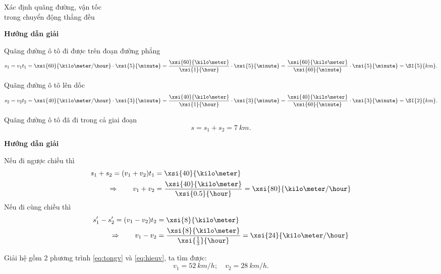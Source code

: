 \begin{dang}{Xác định quãng đường, vận tốc \\trong chuyển động thẳng đều}
	{	\begin{center}
			\textbf{Hướng dẫn giải}
		\end{center}
		
	Quãng đường ô tô đi được trên đoạn đường phẳng
	$$s_1 =v_1t_1 =\xsi{60}{\kilo\meter/\hour}\cdot\xsi{5}{\minute}=\dfrac{\xsi{60}{\kilo\meter}}{\xsi{1}{\hour}}\cdot\xsi{5}{\minute}=\dfrac{\xsi{60}{\kilo\meter}}{\xsi{60}{\minute}}\cdot\xsi{5}{\minute}=\SI{5}{km}.$$
	
	Quãng đường ô tô lên dốc
	$$s_2 = v_2t_2=\xsi{40}{\kilo\meter/\hour}\cdot\xsi{3}{\minute}=\dfrac{\xsi{40}{\kilo\meter}}{\xsi{1}{\hour}}\cdot\xsi{3}{\minute}=\dfrac{\xsi{40}{\kilo\meter}}{\xsi{60}{\minute}}\cdot\xsi{3}{\minute} = \SI{2}{km}.$$
	
	Quãng đường ô tô đã đi trong cả giai đoạn
	$$s = s_1+s_2 = \SI{7}{km}.$$
		
	}
	{	\begin{center}
			\textbf{Hướng dẫn giải}
		\end{center}
		
		Nếu đi ngược chiều thì 
		\begin{align}
			s_1+s_2 =(v_1+v_2)t_1 &=\xsi{40}{\kilo\meter}\nonumber\\
			\Rightarrow\qquad v_1+v_2&=\dfrac{\xsi{40}{\kilo\meter}}{\xsi{0.5}{\hour}}=\xsi{80}{\kilo\meter/\hour}\label{eq:tongv}
		\end{align}
		Nếu đi cùng chiều thì	
		\begin{align}
			s'_1-s'_2 =(v_1-v_2)t_2 &=\xsi{8}{\kilo\meter}\nonumber\\
			\Rightarrow\qquad v_1-v_2&=\dfrac{\xsi{8}{\kilo\meter}}{\xsi{\frac{1}{3}}{\hour}}=\xsi{24}{\kilo\meter/\hour}\label{eq:hieuv}
		\end{align}
		
		Giải hệ gồm 2 phương trình \eqref{eq:tongv} và \eqref{eq:hieuv}, ta tìm được:
		$$v_1 = \SI{52}{km/h};\quad v_2 =\SI{28}{km/h}.$$
		
		
		
	}
\end{dang}
